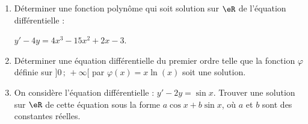 
\begin{exercice}\label{exoautoanalyseCTU-31}


\begin{enumerate}
\item Déterminer une fonction polynôme qui soit solution sur $\eR$ de l'équation différentielle : 

$y'-4y=4x^3-15x^2+2x-3$.
\item Déterminer une équation différentielle du premier ordre telle que la fonction $\varphi$ définie sur $]0\,;\,+\infty[$ par $\varphi(x)=x\ln(x)$ soit une solution.
\item On considère l'équation différentielle : $y'-2y=\sin x$. Trouver une solution sur $\eR$ de cette équation sous la forme $a\cos x+ b\sin x$, où $a$ et $b$ sont des constantes réelles.
\end{enumerate}



\end{exercice}

